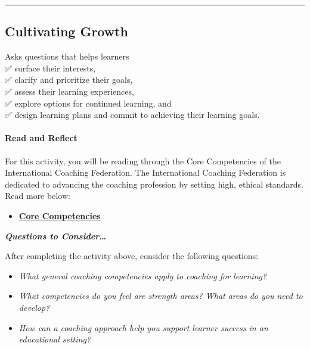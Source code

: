 \documentclass[
]{book}
\providecommand{\tightlist}{%
  \setlength{\itemsep}{0pt}\setlength{\parskip}{0pt}}
\begin{document}
\begin{center}\rule{0.5\linewidth}{0.5pt}\end{center}

\hypertarget{cultivating-growth}{%
\subsection*{Cultivating Growth}\label{cultivating-growth}}

Asks questions that helps learners\\
✅ surface their interests,\\
✅ clarify and prioritize their goals,\\
✅ assess their learning experiences,\\
✅ explore options for continued learning, and\\
✅ design learning plans and commit to achieving their learning goals.

\begin{reflect}
\hypertarget{read-and-reflect}{%
\paragraph{Read and Reflect}\label{read-and-reflect}}

For this activity, you will be reading through the Core Competencies of
the International Coaching Federation. The International Coaching
Federation is dedicated to advancing the coaching profession by setting
high, ethical standards. Read more below:

\begin{itemize}
\tightlist
\item
  \href{https://coachfederation.org/core-competencies}{\textbf{Core
  Competencies}}
\end{itemize}

\textbf{\emph{Questions to Consider\ldots{}}}

After completing the activity above, consider the following questions:

\begin{itemize}
\tightlist
\item
  \emph{What general coaching competencies apply to coaching for
  learning?}
\item
  \emph{What competencies do you feel are strength areas? What areas do
  you need to develop?}
\item
  \emph{How can a coaching approach help you support learner success in
  an educational setting?}
\end{itemize}
\end{reflect}
\end{document}
